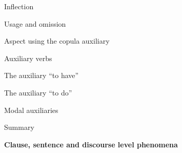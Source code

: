 \begin{listWWNumviiileveli}
\begin{listWWNumviiilevelii}
\setcounter{listWWNumviiileveliii}{0}
\begin{listWWNumviiileveliii}
\item 
\begin{styleListParagraph}
Inflection 
\end{styleListParagraph}

\item 
\begin{styleListParagraph}
Usage and omission 
\end{styleListParagraph}

\item 
\begin{styleListParagraph}
Aspect using the copula auxiliary 
\end{styleListParagraph}

\end{listWWNumviiileveliii}
\item 
\begin{styleListParagraph}
Auxiliary verbs 
\end{styleListParagraph}


\setcounter{listWWNumviiileveliii}{0}
\begin{listWWNumviiileveliii}
\item 
\begin{styleListParagraph}
The auxiliary “to have” 
\end{styleListParagraph}

\item 
\begin{styleListParagraph}
The auxiliary “to do” 
\end{styleListParagraph}

\item 
\begin{styleListParagraph}
Modal auxiliaries
\end{styleListParagraph}

\end{listWWNumviiileveliii}
\item 
\begin{styleListParagraph}
Summary
\end{styleListParagraph}

\end{listWWNumviiilevelii}
\end{listWWNumviiileveli}
\setcounter{listWWNumiileveli}{0}
\begin{listWWNumiileveli}
\item 
\begin{styleListParagraph}
\textbf{Clause, sentence and discourse level phenomena }
\end{styleListParagraph}

\end{listWWNumiileveli}
